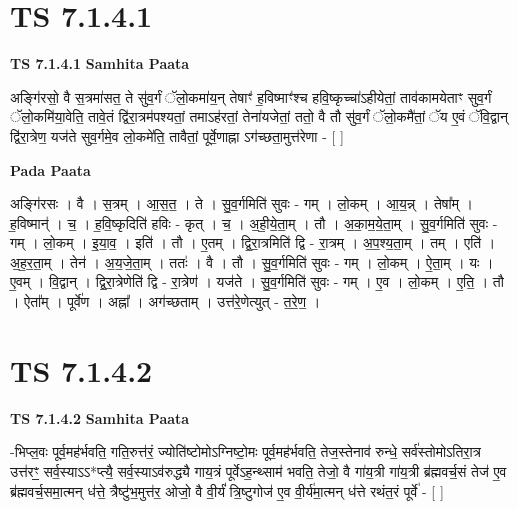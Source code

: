 \documentclass[17pt]{extarticle}
\begin{document}
\section*{ TS 7.1.4.1 }

\textbf{TS 7.1.4.1 } \newline
\textbf{Samhita Paata} \newline

अङ्गि॑रसो॒ वै स॒त्रमा॑सत॒ ते सु॑व॒र्गं ॅलो॒कमा॑य॒न् तेषाꣳ॑ ह॒विष्माꣳ॑श्च हवि॒ष्कृच्चा॑ऽहीयेतां॒ ताव॑कामयेताꣳ सुव॒र्गं ॅलो॒कमि॑या॒वेति॒ तावे॒तं द्वि॑रा॒त्रम॑पश्यतां॒ तमाऽह॑रतां॒ तेना॑यजेतां॒ ततो॒ वै तौ सु॑व॒र्गं ॅलो॒कमै॑तां॒ ॅय ए॒वं ॅवि॒द्वान् द्वि॑रा॒त्रेण॒ यज॑ते सुव॒र्गमे॒व लो॒कमे॑ति॒ तावैतां॒ पूर्वे॒णाह्ना ऽग॑च्छता॒मुत्त॑रेणा - [  ] \newline

\textbf{Pada Paata} \newline

अङ्गि॑रसः । वै । स॒त्रम् । आ॒स॒त॒ । ते । सु॒व॒र्गमिति॑ सुवः - गम् । लो॒कम् । आ॒य॒न्न् । तेषा᳚म् । ह॒विष्मान्॑ । च॒ । ह॒वि॒ष्कृदिति॑ हविः - कृत् । च॒ । अ॒ही॒ये॒ता॒म् । तौ । अ॒का॒म॒ये॒ता॒म् । सु॒व॒र्गमिति॑ सुवः - गम् । लो॒कम् । इ॒या॒व॒ । इति॑ । तौ । ए॒तम् । द्वि॒रा॒त्रमिति॑ द्वि - रा॒त्रम् । अ॒प॒श्य॒ता॒म् । तम् । एति॑ । अ॒ह॒र॒ता॒म् । तेन॑ । अ॒य॒जे॒ता॒म् । ततः॑ । वै । तौ । सु॒व॒र्गमिति॑ सुवः - गम् । लो॒कम् । ऐ॒ता॒म् । यः । ए॒वम् । वि॒द्वान् । द्वि॒रा॒त्रेणेति॑ द्वि - रा॒त्रेण॑ । यज॑ते । सु॒व॒र्गमिति॑ सुवः - गम् । ए॒व । लो॒कम् । ए॒ति॒ । तौ । ऐता᳚म् । पूर्वे॑ण । अह्ना᳚ । अग॑च्छताम् । उत्त॑रे॒णेत्युत् - त॒रे॒ण॒ ।  \newline




\section*{ TS 7.1.4.2 }

\textbf{TS 7.1.4.2 } \newline
\textbf{Samhita Paata} \newline

-भिप्ल॒वः पूर्व॒मह॑र्भवति॒ गति॒रुत्त॑रं॒ ज्योति॑ष्टोमोऽग्निष्टो॒मः पूर्व॒मह॑र्भवति॒ तेज॒स्तेनाव॑ रुन्धे॒ सर्व॑स्तोमोऽतिरा॒त्र उत्त॑रꣳ॒॒ सर्व॒स्याऽऽ*प्त्यै॒ सर्व॒स्याऽव॑रुद्ध्यै गाय॒त्रं पूर्वेऽह॒न्थ्साम॑ भवति॒ तेजो॒ वै गा॑य॒त्री गा॑य॒त्री ब्र॑ह्मवर्च॒सं तेज॑ ए॒व ब्र॑ह्मवर्च॒समा॒त्मन् ध॑त्ते॒ त्रैष्टु॑भ॒मुत्त॑र॒ ओजो॒ वै वी॒र्यं॑ त्रि॒ष्टुगोज॑ ए॒व वी॒र्य॑मा॒त्मन् ध॑त्ते रथंत॒रं पूर्वे॑ - [  ] \newline
\end{document}
